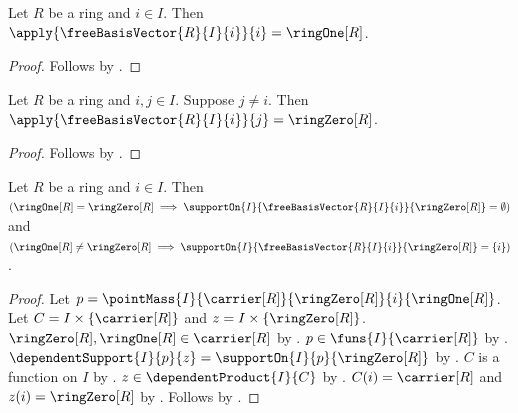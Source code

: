 \begin{proposition}\label{free_basis_vector_selected_coordinate}
    Let $R$ be a ring and $i\in I$.
    Then $\apply{\freeBasisVector{R}{I}{i}}{i}=\ringOne[R]$.
\end{proposition}
\begin{proof}
    Follows by
        .
\end{proof}

\begin{proposition}\label{free_basis_vector_other_coordinate}
    Let $R$ be a ring and $i,j\in I$.
    Suppose $j\neq i$.
    Then $\apply{\freeBasisVector{R}{I}{i}}{j}=\ringZero[R]$.
\end{proposition}
\begin{proof}
    Follows by
        .
\end{proof}

\begin{proposition}\label{free_basis_vector_support}
    Let $R$ be a ring and $i\in I$.
    Then
        $(\ringOne[R]=\ringZero[R]\implies
            \supportOn{I}{\freeBasisVector{R}{I}{i}}{\ringZero[R]}
                =\emptyset)$ and
        $(\ringOne[R]\neq\ringZero[R]\implies
            \supportOn{I}{\freeBasisVector{R}{I}{i}}{\ringZero[R]}
                =\{i\})$.
\end{proposition}
\begin{proof}
    Let $p=\pointMass{I}{\carrier[R]}{\ringZero[R]}{i}{
        \ringOne[R]}$.
    Let $C=I\times\{\carrier[R]\}$ and
        $z=I\times\{\ringZero[R]\}$.
    $\ringZero[R],\ringOne[R]\in\carrier[R]$ by
        .
    $p\in\funs{I}{\carrier[R]}$ by
        .
    $\dependentSupport{I}{p}{z}=\supportOn{I}{p}{\ringZero[R]}$ by
        .
    $C$ is a function on $I$ by
        .
    $z\in\dependentProduct{I}{C}$ by
        .
    $C(i)=\carrier[R]$ and $z(i)=\ringZero[R]$ by
        .
    Follows by
        .
\end{proof}

